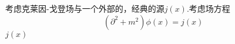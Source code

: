 
考虑克莱因-戈登场与一个外部的，经典的源$j(x)$.考虑场方程
\begin{equation}
(\partial^2+m^2)\phi(x) = j(x)
\end{equation}
$j(x)$